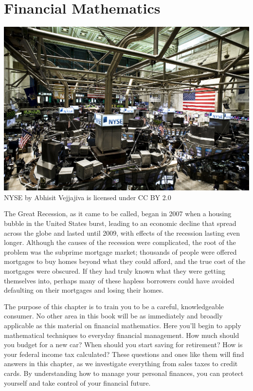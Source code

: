 \documentclass[9pt,letter,twoside,openright]{memoir}
\begin{document}
\frontmatter
{}
\pagestyle{empty}
\titleBC
\frontmatter


\setcounter{tocdepth}{1}
\tableofcontents*
\mainmatter
\restoregeometry
\pagestyle{doc}

\chapter{Financial Mathematics}
\begin{center}
\includegraphics[width=\textwidth]{NYSE2}\\
\text{} \hfill {\color{gray} NYSE by Abhisit Vejjajiva is licensed under CC BY 2.0}
\end{center}
\vfill

The Great Recession, as it came to be called, began in 2007 when a housing bubble in the United States burst, leading to an economic decline that spread across the globe and lasted until 2009, with effects of the recession lasting even longer.  Although the causes of the recession were complicated, the root of the problem was the subprime mortgage market; thousands of people were offered mortgages to buy homes beyond what they could afford, and the true cost of the mortgages were obscured.  If they had truly known what they were getting themselves into, perhaps many of these hapless borrowers could have avoided defaulting on their mortgages and losing their homes.

The purpose of this chapter is to train you to be a careful, knowledgeable consumer.  No other area in this book will be as immediately and broadly applicable as this material on financial mathematics.  Here you'll begin to apply mathematical techniques to everyday financial management.  How much should you budget for a new car?  When should you start saving for retirement?  How is your federal income tax calculated?  These questions and ones like them will find answers in this chapter, as we investigate everything from sales taxes to credit cards.  By understanding how to manage your personal finances, you can protect yourself and take control of your financial future.
\vfill
\pagebreak
\end{document}
